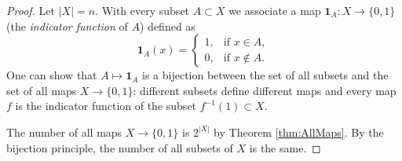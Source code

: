 \begin{proof}
Let $|X| = n$. With every subset $A \subset X$ we associate a map $\mathbf{1}_A \colon X \to \{0,1\}$ (the \emph{indicator function} of $A$) defined as
\[
\mathbf{1}_A(x) =
\begin{cases}
1, &\text{if } x \in A,\\
0, &\text{if } x \notin A.
\end{cases}
\]
One can show that $A \mapsto \mathbf{1}_A$ is a bijection between the set of all subsets and the set of all maps $X \to \{0,1\}$:
different subsets define different maps and every map $f$ is the indicator function of the subset $f^{-1}(1) \subset X$.

The number of all maps $X \to \{0,1\}$ is $2^{|X|}$ by Theorem \ref{thm:AllMaps}.
By the bijection principle, the number of all subsets of $X$ is the same.
\end{proof}
